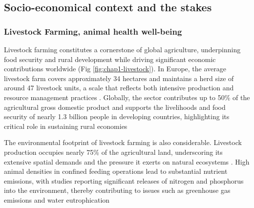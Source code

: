 \subsection{Socio-economical context and the stakes}




\subsubsection*{Livestock Farming, animal health well-being}

Livestock farming constitutes a cornerstone of global agriculture, underpinning food security and rural development while driving significant economic contributions worldwide (Fig \ref{fig:chap1-livestock}). In Europe, the average livestock farm covers approximately 34 hectares and maintains a herd size of around 47 livestock units, a scale that reflects both intensive production and resource management practices \cite{INRA_Livestock_Production}. Globally, the sector contributes up to 50\% of the agricultural gross domestic product and supports the livelihoods and food security of nearly 1.3 billion people in developing countries, highlighting its critical role in sustaining rural economies \cite{Herrero2016, FAO2017}

The environmental footprint of livestock farming is also considerable. Livestock production occupies nearly 75\% of the agricultural land, underscoring its extensive spatial demands and the pressure it exerts on natural ecosystems \cite{Steinfeld181371}. High animal densities in confined feeding operations lead to substantial nutrient emissions, with studies reporting significant releases of nitrogen and phosphorus into the environment, thereby contributing to issues such as greenhouse gas emissions and water eutrophication \cite{Ramankutty2018, Mallin2015, LI2016451}


